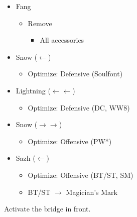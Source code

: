 \begin{menu}
\begin{itemize}
\begin{itemize}
\begin{itemize}
\begin{itemize}
					            \end{itemize}
				      \end{itemize}
			\end{itemize}
			\equip
			\begin{itemize}
				\item Fang
				      \begin{itemize}
					      \item Remove
					            \begin{itemize}
						            \item All accessories
					            \end{itemize}
				      \end{itemize}
				\item Snow ($\leftarrow$)
				      \begin{itemize}
					      \item Optimize: Defensive (Soulfont)
				      \end{itemize}
				\item Lightning ($\leftarrow\leftarrow$)
				      \begin{itemize}
					      \item Optimize: Defensive (DC, WW8)
				      \end{itemize}
				\item Snow ($\rightarrow\rightarrow$)
				      \begin{itemize}
					      \item Optimize: Offensive (PW*)
				      \end{itemize}
				\item Sazh ($\leftarrow$)
				      \begin{itemize}
					      \item Optimize: Offensive (BT/ST, SM)
					      \item BT/ST $\rightarrow$ Magician's Mark
				      \end{itemize}
			\end{itemize}
		\end{itemize}
	\end{menu}

	Activate the bridge in front.

